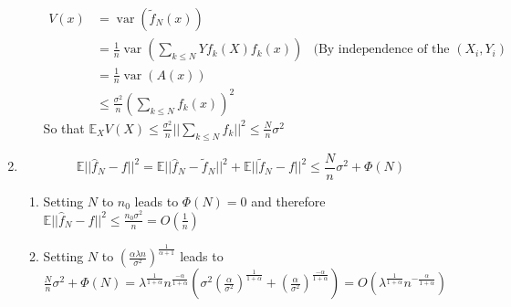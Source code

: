 \emph{}\documentclass[12pt]{article}
\DeclareMathOperator{\var}{var}
\begin{document}
\begin{enumerate}
\begin{enumerate}
    \begin{align*}
      V(x) &= \var(\tilde f_N(x))
      \\&= \frac1 n \var\left( \sum_{k \le N} Y f_k(X)f_k(x)\right) & \text{(By independence of the $(X_i, Y_i)$} 
      \\&= \frac1 n \var(A(x))
      \\&\le \frac{\sigma^2} n (\sum_{k \le N} f_k(x))^2
    \end{align*}        
    So that $\mathbb E_X V(X)  \le \frac{\sigma^2}{n} ||\sum_{k \le N} f_k||^2 \le \frac N n \sigma^2$
  \end{enumerate}
\item
  $$\mathbb E ||\hat f_N - f ||^2 = \mathbb E ||\hat f_N - \tilde f_N||^2 + \mathbb E ||\tilde f_N - f|| ^2 \le \frac Nn \sigma^2 + \Phi(N)$$
  \begin{enumerate}
  \item Setting $N$ to $n_0$ leads to $\Phi(N) = 0$ and therefore
    $\mathbb E ||\hat f_N - f ||^2 \le \frac{n_0 \sigma^2} {n} = O(\frac 1 n)$
  \item Setting $N$ to $(\frac{\alpha \lambda n}{\sigma^2})^{\frac 1{\alpha+1}}$ leads to
    $\frac N n \sigma^2 + \Phi(N) =
    \lambda^{\frac1 {1+\alpha}} n^{\frac{-\alpha} {1+\alpha}}
    \left(\sigma^2 (\frac{\alpha}{\sigma^2})^{\frac1 {1+\alpha}} 
      + (\frac{\alpha}{\sigma^2})^{\frac{-\alpha} {1+\alpha}}
      \right)
    = O(\lambda^{\frac1 {1+\alpha}} n^{-\frac \alpha {1+\alpha}}) $
  \end{enumerate}
  
\end{enumerate}
\end{document}
